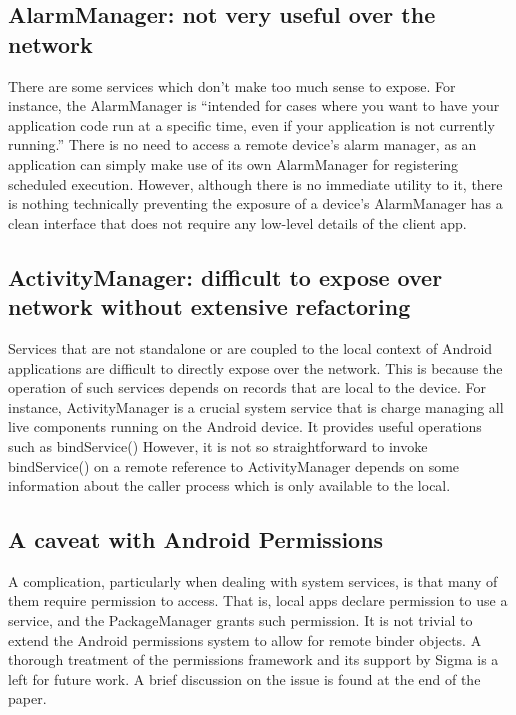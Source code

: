 \documentclass[prodmode]{acmlarge}
\begin{document}
\subsection{AlarmManager: not very useful over the network}
There are some services which don't make too much sense to expose. For instance, the AlarmManager is ``intended for cases where you want to have your application code run at a specific time, even if your application is not currently running.'' There is no need to access a remote device's alarm manager, as an application can simply make use of its own AlarmManager for registering scheduled execution. However, although there is no immediate utility to it, there is nothing technically preventing the exposure of a device's AlarmManager has a clean interface that does not require any low-level details of the client app.

\subsection{ActivityManager: difficult to expose over network without extensive refactoring}
Services that are not standalone or are coupled to the local context of Android applications are difficult to directly expose over the network. This is because the operation of such services depends on records that are local to the device. For instance, ActivityManager is a crucial system service that is charge managing all live components running on the Android device. It provides useful operations such as bindService()  However, it is not so straightforward to invoke bindService() on a remote reference to ActivityManager depends on some information about the caller process which is only available to the local.

\subsection{A caveat with Android Permissions}
A complication, particularly when dealing with system services, is that many of them require permission to access. That is, local apps declare permission to use a service, and the PackageManager grants such permission. It is not trivial to extend the Android permissions system to allow for remote binder objects. A thorough treatment of the permissions framework and its support by Sigma is a left for future work. A brief discussion on the issue is found at the end of the paper.
\end{document}
